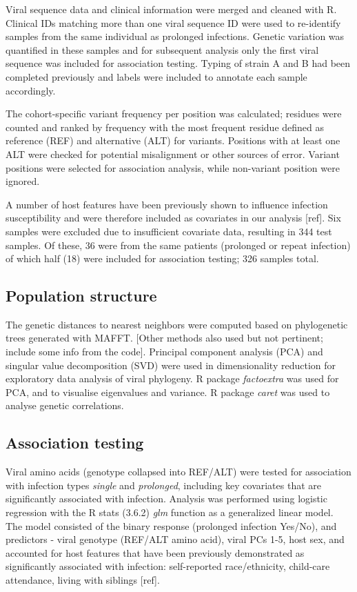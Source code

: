 \documentclass{article} %
\begin{document}
Viral sequence data and clinical information were merged and cleaned with R.
Clinical IDs matching more than one viral sequence ID were used to re-identify samples from the same individual as prolonged infections. 
Genetic variation was quantified in these samples and for subsequent analysis only the first viral sequence was included for association testing. 
Typing of strain A and B had been completed previously and labels were included to annotate each sample accordingly.

The cohort-specific variant frequency per position was calculated;
residues were counted and ranked by frequency
with the most frequent residue defined as reference (REF) and alternative (ALT) for variants.
Positions with at least one ALT were checked for potential misalignment or other sources of error. 
Variant positions were selected for association analysis, while non-variant position were ignored.

A number of host features have been previously shown to influence infection susceptibility and were therefore included as covariates in our analysis [ref]. %
Six samples were excluded due to insufficient covariate data, resulting in 344 test samples. 
Of these, 36 were from the same patients (prolonged or repeat infection) of which half (18) were included for association testing; 326 samples total.

\subsection{Population structure}
The genetic distances to nearest neighbors were computed based on phylogenetic 
trees generated with MAFFT.
[Other methods also used but not pertinent; include some info from the code].
Principal component analysis (PCA) and singular value decomposition (SVD) were used in dimensionality reduction for exploratory data analysis of viral phylogeny.
R package \textit{factoextra} was used for PCA, and to visualise eigenvalues and variance. 
R package \textit{caret} was used to analyse genetic correlations.

\subsection{Association testing}
Viral amino acids (genotype collapsed into REF/ALT) were tested for association with infection types \textit{single} and \textit{prolonged}, 
including key covariates that are significantly associated with infection.
Analysis was performed using logistic regression with the
R stats (3.6.2) \textit{glm} function as a generalized linear model.
The model consisted of the binary response (prolonged infection Yes/No), and predictors - viral genotype (REF/ALT amino acid), viral PCs 1-5, host sex, and accounted for host features that have been previously demonstrated as significantly associated with infection: 
self-reported race/ethnicity, child-care attendance, living with siblings [ref]. %
\end{document}
